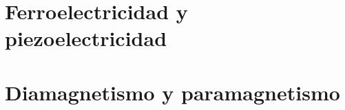 \documentclass[11pt]{report}
\theoremstyle{plain}
\theoremstyle{definition}
\begin{document}
\chapter{Ferroelectricidad y piezoelectricidad}

\chapter{Diamagnetismo y paramagnetismo}


\end{document}

